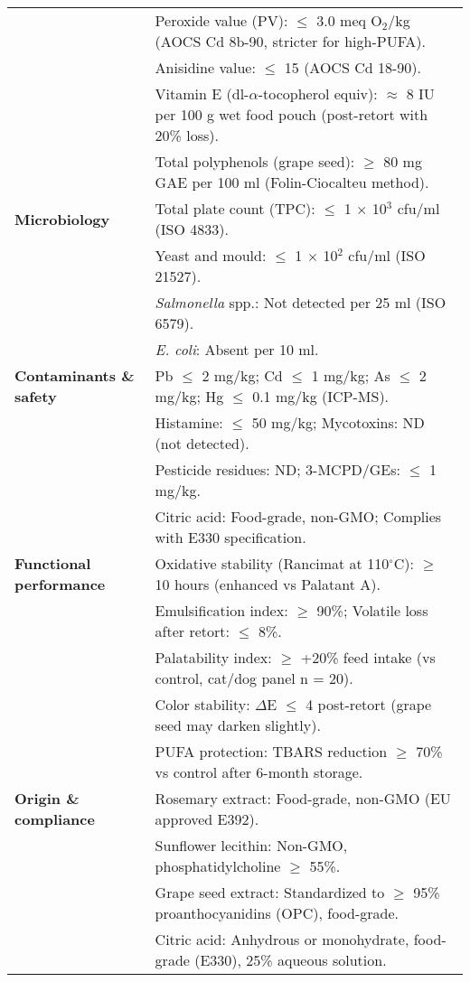 \begin{adjustbox}{max width=\textwidth}
\begin{tabular}{@{}p{}p{}@{}}
& Peroxide value (PV): $\leq$ 3.0 meq O$_2$/kg (AOCS Cd 8b-90, stricter for high-PUFA).\\
& Anisidine value: $\leq$ 15 (AOCS Cd 18-90).\\
& Vitamin E (dl-$\alpha$-tocopherol equiv): $\approx$ 8 IU per 100 g wet food pouch (post-retort with 20\% loss).\\
& Total polyphenols (grape seed): $\geq$ 80 mg GAE per 100 ml (Folin-Ciocalteu method).\\
\midrule
\textbf{Microbiology} &
Total plate count (TPC): $\leq$ 1 $\times$ 10$^3$ cfu/ml (ISO 4833).\\
& Yeast and mould: $\leq$ 1 $\times$ 10$^2$ cfu/ml (ISO 21527).\\
& \textit{Salmonella} spp.: Not detected per 25 ml (ISO 6579).\\
& \textit{E. coli}: Absent per 10 ml.\\
\midrule
\textbf{Contaminants \& safety} &
Pb $\leq$ 2 mg/kg; Cd $\leq$ 1 mg/kg; As $\leq$ 2 mg/kg; Hg $\leq$ 0.1 mg/kg (ICP-MS).\\
& Histamine: $\leq$ 50 mg/kg; Mycotoxins: ND (not detected).\\
& Pesticide residues: ND; 3-MCPD/GEs: $\leq$ 1 mg/kg.\\
& Citric acid: Food-grade, non-GMO; Complies with E330 specification.\\
\midrule
\textbf{Functional performance} &
Oxidative stability (Rancimat at 110$^\circ$C): $\geq$ 10 hours (enhanced vs Palatant A).\\
& Emulsification index: $\geq$ 90\%; Volatile loss after retort: $\leq$ 8\%.\\
& Palatability index: $\geq$ +20\% feed intake (vs control, cat/dog panel n = 20).\\
& Color stability: $\Delta$E $\leq$ 4 post-retort (grape seed may darken slightly).\\
& PUFA protection: TBARS reduction $\geq$ 70\% vs control after 6-month storage.\\
\midrule
\textbf{Origin \& compliance} &
Rosemary extract: Food-grade, non-GMO (EU approved E392).\\
& Sunflower lecithin: Non-GMO, phosphatidylcholine $\geq$ 55\%.\\
& Grape seed extract: Standardized to $\geq$ 95\% proanthocyanidins (OPC), food-grade.\\
& Citric acid: Anhydrous or monohydrate, food-grade (E330), 25\% aqueous solution.\\

\end{tabular}
\end{adjustbox}
